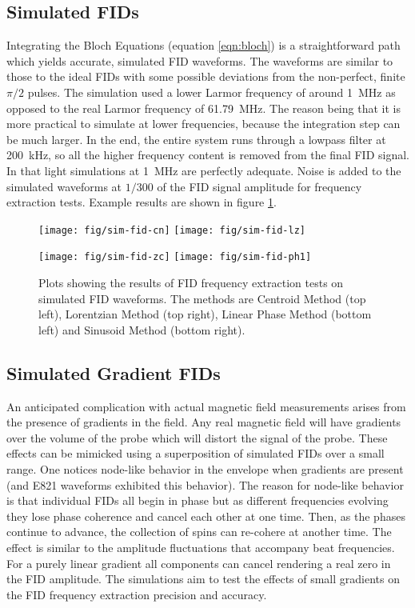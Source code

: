 \subsection{Simulated FIDs}
Integrating the Bloch Equations (equation \ref{eqn:bloch}) is a straightforward path which yields accurate, simulated FID waveforms.  The waveforms are similar to those to the ideal FIDs with some possible deviations from the non-perfect, finite $\pi/2$ pulses.  The simulation used a lower Larmor frequency of around \SI{1}{\MHz} as opposed to the real Larmor frequency of \SI{61.79}{\MHz}.  The reason being that it is more practical to simulate at lower frequencies, because the integration step can be much larger.  In the end, the entire system runs through a lowpass filter at \SI{200}{\kHz}, so all the higher frequency content is removed from the final FID signal.  In that light simulations at \SI{1}{\MHz} are perfectly adequate.  Noise is added to the simulated waveforms at $1/300$ of the FID signal amplitude for frequency extraction tests.  Example results are shown in figure \ref{fig:fid-sim-freq-extraction}.

\begin{figure}
\centering
\texttt{[image: fig/sim-fid-cn]}
\texttt{[image: fig/sim-fid-lz]}

\texttt{[image: fig/sim-fid-zc]}
\texttt{[image: fig/sim-fid-ph1]}

\caption{
    Plots showing the results of FID frequency extraction tests on simulated FID waveforms.  The methods are Centroid Method (top left), Lorentzian Method (top right), Linear Phase Method (bottom left) and Sinusoid Method (bottom right).  
    \label{fig:fid-sim-freq-extraction}
}
\end{figure}

\subsection{Simulated Gradient FIDs}
An anticipated complication with actual magnetic field measurements arises from the presence of gradients in the field.  Any real magnetic field will have gradients over the volume of the probe which will distort the signal of the probe.  These effects can be mimicked using a superposition of simulated FIDs over a small range.  One notices node-like behavior in the envelope when gradients are present (and E821 waveforms exhibited this behavior).  The reason for node-like behavior is that individual FIDs all begin in phase but as different frequencies evolving they lose phase coherence and cancel each other at one time.  Then, as the phases continue to advance, the collection of spins can re-cohere at another time.  The effect is similar to the amplitude fluctuations that accompany beat frequencies.  For a purely linear gradient all components can cancel rendering a real zero in the FID amplitude.  The simulations aim to test the effects of small gradients on the FID frequency extraction precision and accuracy.

